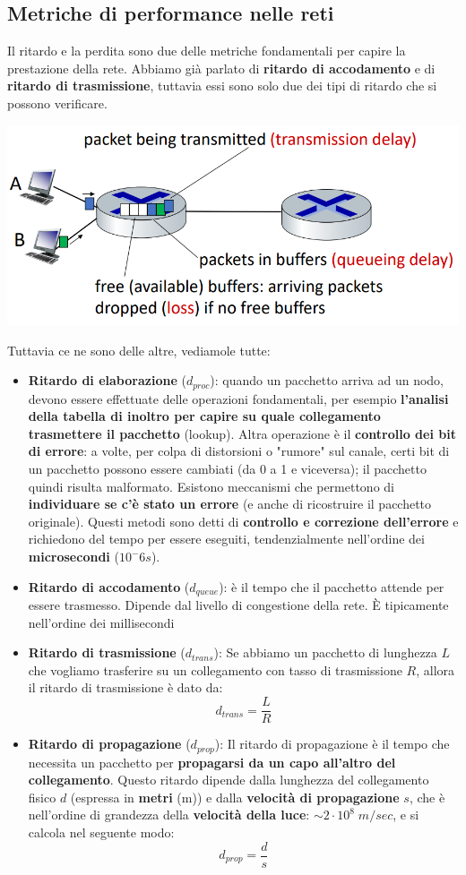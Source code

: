 \documentclass[12pt]{article}
\begin{document}
\subsection{Metriche di performance nelle reti}
Il ritardo e la perdita sono due delle metriche fondamentali per capire la prestazione della rete.
Abbiamo già parlato di \textbf{ritardo di accodamento} e di \textbf{ritardo di trasmissione}, tuttavia essi sono
solo due dei tipi di ritardo che si possono verificare.
\begin{center}
    \includegraphics[width =0.70\linewidth]{Images/18.PNG}
\end{center}
Tuttavia ce ne sono delle altre, vediamole tutte: 
\begin{itemize}
    \item \textbf{Ritardo di elaborazione} ($d_{proc}$): quando un pacchetto arriva ad un nodo, devono essere effettuate delle operazioni fondamentali, per esempio \textbf{l'analisi della tabella di inoltro per capire su quale collegamento trasmettere il pacchetto} (lookup).
    Altra operazione è il \textbf{controllo dei bit di errore}: a volte, per colpa di distorsioni o "rumore" sul canale, certi bit di un pacchetto possono essere cambiati (da 0 a 1 e viceversa); il pacchetto quindi risulta malformato. Esistono meccanismi che permettono
    di \textbf{individuare se c'è stato un errore} (e anche di ricostruire il pacchetto originale). Questi metodi sono detti di \textbf{controllo e correzione dell'errore} e richiedono del tempo per essere eseguiti, tendenzialmente nell'ordine dei \textbf{microsecondi} ($10^-6 s$).
    \item \textbf{Ritardo di accodamento} ($d_{queue}$): è il tempo che il pacchetto attende per essere trasmesso. Dipende dal livello di congestione della rete. È tipicamente nell'ordine dei millisecondi
    \item \textbf{Ritardo di trasmissione} ($d_{trans}$): Se abbiamo un pacchetto di lunghezza $L$ che vogliamo trasferire su un collegamento con tasso di trasmissione $R$, allora il ritardo di trasmissione è dato da:
    $$d_{trans} = \frac{L}{R}$$
    \item \textbf{Ritardo di propagazione} ($d_{prop}$): Il ritardo di propagazione è il tempo che necessita un pacchetto per \textbf{propagarsi da un capo all'altro del collegamento}. Questo ritardo dipende dalla lunghezza del collegamento fisico $d$ (espressa in \textbf{metri} (m))
    e dalla \textbf{velocità di propagazione} $s$, che è nell'ordine di grandezza della \textbf{velocità della luce}: $\sim 2 \cdot 10^8 \; m/sec$, e si calcola nel seguente modo:
    $$d_{prop} = \frac{d}{s}$$
\end{itemize}
\end{document}
